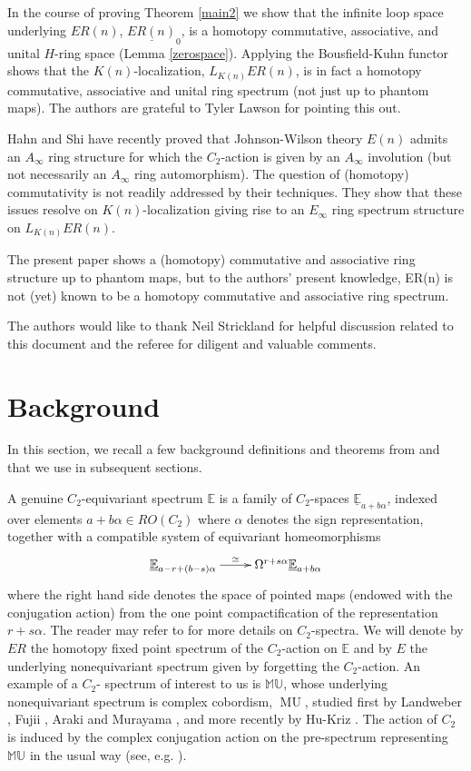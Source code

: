 \documentclass[12pt]{amsart}
\numberwithin{equation}{section}
\theoremstyle{plain}  %
\theoremstyle{definition}  %
\newcommand{\MU}{\mathbb {MU}}
\newcommand{\E}{\mathbb{E}}
\DeclareMathOperator{\MUg}{MU}
\begin{document}
In the course of proving Theorem \ref{main2} we show that the infinite loop space underlying $ER(n)$, $\underline{ER(n)}_0$, is a homotopy commutative, associative, and unital $H$-ring space (Lemma \ref{zerospace}). Applying the Bousfield-Kuhn functor shows that the $K(n)$-localization, $L_{K(n)}ER(n)$, is in fact a homotopy commutative, associative and unital ring spectrum (not just up to phantom maps). The authors are grateful to Tyler Lawson for pointing this out. 

Hahn and Shi \cite{HS17} have recently proved that Johnson-Wilson theory $E(n)$ admits an $A_\infty$ ring structure for which the $C_2$-action is given by an $A_\infty$ involution (but not necessarily an $A_\infty$ ring automorphism). The question of (homotopy) commutativity is not readily addressed by their techniques. They show that these issues resolve on $K(n)$-localization giving rise to an $E_\infty$ ring spectrum structure on $L_{K(n)}ER(n)$. 

The present paper shows a (homotopy) commutative and associative ring structure up to
phantom maps, but to the authors' present knowledge, ER(n) is not (yet) known to be a
homotopy commutative and associative ring spectrum.


\medskip
\noindent
The authors would like to thank Neil Strickland for helpful discussion related to this document and the referee for diligent and valuable comments.


\section{Background}

\medskip

In this section, we recall a few background definitions and theorems from \cite{KW07b} and \cite{KLW16a} that we use in subsequent sections.

\medskip
\noindent
A genuine $C_2$-equivariant spectrum $\E$ is a family of $C_2$-spaces $\underline{\E}_{a+b\alpha}$, indexed over elements $a+b\alpha \in RO(C_2)$ where $\alpha$ denotes the sign representation, together with a compatible system of equivariant homeomorphisms
$$\xymatrix{ \underline{\E}_{a-r+(b-s)\alpha} \ar@{->}[r]^-{\simeq} & \Omega^{r+s\alpha} \underline{\E}_{a+b\alpha}}$$
where the right hand side denotes the space of pointed maps (endowed with the conjugation action) from the one point compactification of the representation $r+s\alpha$. The reader may refer to \cite{HK01} for more details on $C_2$-spectra. We will denote by $ER$ the homotopy fixed
point spectrum of the $C_2$-action on $\E$ and by $E$ the underlying nonequivariant spectrum given by forgetting the $C_2$-action. An example of a $C_2$- spectrum of interest to us is $\MU$, whose underlying nonequivariant spectrum is complex cobordism, $\MUg$, studied first by Landweber \cite{Lan68}, Fujii \cite{Fuj}, Araki and Murayama \cite{AM78}, and more recently by Hu-Kriz \cite{HK01}. The action of $C_2$ is induced by the complex conjugation action on the pre-spectrum representing $\MU$ in the usual way (see, e.g. \cite{HK01}). 
\end{document}
